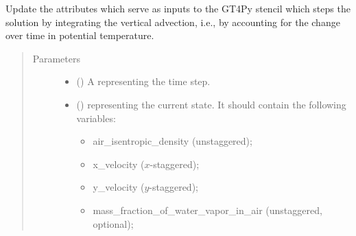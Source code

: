 \documentclass[letterpaper,10pt,english]{sphinxmanual}
\begin{document}
\begin{fulllineitems}
\begin{fulllineitems}
\begin{quote}
\begin{description}
\begin{itemize}
\end{itemize}


\end{description}\end{quote}

\end{fulllineitems}


\begin{fulllineitems}
\label{\detokenize{api:tasmania.dycore.prognostic_isentropic_nonconservative.PrognosticIsentropicNonconservative._stencil_stepping_by_coupling_physics_with_dynamics_set_inputs}}
Update the attributes which serve as inputs to the GT4Py stencil which steps the solution
by integrating the vertical advection, i.e., by accounting for the change over time in potential temperature.
\begin{quote}\begin{description}
\item[{Parameters}] \leavevmode\begin{itemize}
\item {} 
 () \textendash{} A  representing the time step.

\item {} 
 () \textendash{} 
{\hyperref[\detokenize{api:tasmania.storages.state_isentropic.StateIsentropic}]{}} representing the current state.
It should contain the following variables:
\begin{itemize}
\item {} 
air\_isentropic\_density (unstaggered);

\item {} 
x\_velocity (\(x\)-staggered);

\item {} 
y\_velocity (\(y\)-staggered);

\item {} 
mass\_fraction\_of\_water\_vapor\_in\_air (unstaggered, optional);


\end{itemize}
\end{itemize}
\end{description}
\end{quote}
\end{fulllineitems}
\end{fulllineitems}
\end{document}
